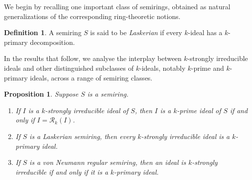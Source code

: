 \documentclass[11pt,leqno]{amsart}
\newtheorem{proposition}[theorem]{Proposition}
\theoremstyle{definition}
\newtheorem{definition}[theorem]{Definition}
\numberwithin{equation}{section}
\begin{document}
We begin by recalling one important class of semirings, obtained as natural generalizations of the corresponding ring-theoretic notions.
\begin{definition}
A semiring $S$ is said to be \emph{Laskerian} if every $k$-ideal has a $k$-primary decomposition.
       
    
\end{definition}
In the results that follow, we analyse the interplay between $k$-strongly irreducible ideals and other distinguished subclasses of $k$-ideals, notably $k$-prime and $k$-primary ideals, across a range of semiring classes.

\begin{proposition}\label{loc3}
Suppose $S$ is a semiring. 
\begin{enumerate}
\item If $I$ is a $k$-strongly irreducible ideal of $S$, then $I$ is a $k$-prime ideal of $S$ if and only if $I=\mathcal{R}_k(I)$.
\item If $S$ is a Laskerian semiring, then every $k$-strongly irreducible ideal is a $k$-primary ideal.

\item If $S$ is a von Neumann regular semiring, then an ideal is $k$-strongly irreducible if and only if
it is a $k$-primary ideal.
\end{enumerate}
\end{proposition}
\end{document}
